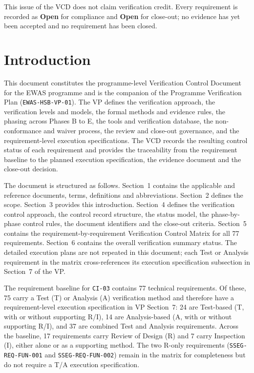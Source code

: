 This issue of the VCD does not claim verification credit. Every requirement is recorded as \textbf{Open} for compliance and \textbf{Open} for close-out; no evidence has yet been accepted and no requirement has been closed.

\section{Introduction}

This document constitutes the programme-level Verification Control Document for the EWAS programme and is the companion of the Programme Verification Plan (\texttt{EWAS-HSB-VP-01}). The VP defines the verification approach, the verification levels and models, the formal methods and evidence rules, the phasing across Phases B to E, the tools and verification database, the non-conformance and waiver process, the review and close-out governance, and the requirement-level execution specifications. The VCD records the resulting control status of each requirement and provides the traceability from the requirement baseline to the planned execution specification, the evidence document and the close-out decision.

The document is structured as follows. Section~1 contains the applicable and reference documents, terms, definitions and abbreviations. Section~2 defines the scope. Section~3 provides this introduction. Section~4 defines the verification control approach, the control record structure, the status model, the phase-by-phase control rules, the document identifiers and the close-out criteria. Section~5 contains the requirement-by-requirement Verification Control Matrix for all 77 requirements. Section~6 contains the overall verification summary status. The detailed execution plans are not repeated in this document; each Test or Analysis requirement in the matrix cross-references its execution specification subsection in Section~7 of the VP.

The requirement baseline for \texttt{CI-03} contains 77 technical requirements. Of these, 75 carry a Test (T) or Analysis (A) verification method and therefore have a requirement-level execution specification in VP Section~7: 24 are Test-based (T, with or without supporting R/I), 14 are Analysis-based (A, with or without supporting R/I), and 37 are combined Test and Analysis requirements. Across the baseline, 17 requirements carry Review of Design (R) and 7 carry Inspection (I), either alone or as a supporting method. The two R-only requirements (\texttt{SSEG-REQ-FUN-001} and \texttt{SSEG-REQ-FUN-002}) remain in the matrix for completeness but do not require a T/A execution specification.

